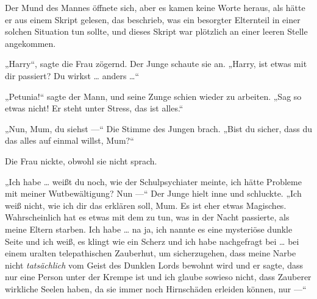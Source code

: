Der Mund des Mannes öffnete sich, aber es kamen keine Worte heraus, als hätte er aus einem Skript gelesen, das beschrieb, was ein besorgter Elternteil in einer solchen Situation tun sollte, und dieses Skript war plötzlich an einer leeren Stelle angekommen.



„Harry“, sagte die Frau zögernd. Der Junge schaute sie an.
„Harry, ist etwas mit dir passiert? Du wirkst … anders …“

„Petunia!“ sagte der Mann, und seine Zunge schien wieder zu arbeiten.
„Sag so etwas nicht! Er steht unter Stress, das ist alles.“

„Nun, Mum, du siehst —“ Die Stimme des Jungen brach.
„Bist du sicher, dass du das alles auf einmal willst, Mum?“

Die Frau nickte, obwohl sie nicht sprach.

„Ich habe … weißt du noch, wie der Schulpsychiater meinte, ich hätte Probleme mit meiner Wutbewältigung? Nun —“ Der Junge hielt inne und schluckte.
„Ich weiß nicht, wie ich dir das erklären soll, Mum. Es ist eher etwas Magisches. Wahrscheinlich hat es etwas mit dem zu tun, was in der Nacht passierte, als meine Eltern starben. Ich habe … na ja, ich nannte es eine mysteriöse dunkle Seite und ich weiß, es klingt wie ein Scherz und ich habe nachgefragt bei … bei einem uralten telepathischen Zauberhut, um sicherzugehen, dass meine Narbe nicht \emph{tatsächlich} vom Geist des Dunklen Lords bewohnt wird und er sagte, dass nur eine Person unter der Krempe ist und ich glaube sowieso nicht, dass Zauberer wirkliche Seelen haben, da sie immer noch Hirnschäden erleiden können, nur —“

